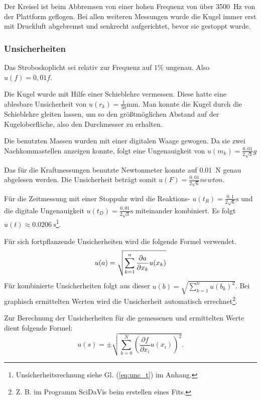 	Der Kreisel ist beim Abbremsen von einer hohen Frequenz von über \SI{3500}{\hertz} von der Plattform geflogen.
	Bei allen weiteren Messungen wurde die Kugel immer erst mit Druckluft abgebremst und senkrecht aufgerichtet, bevor sie gestoppt wurde.
	
	\subsubsection{Unsicherheiten}
	
	Das Stroboskoplicht sei relativ zur Frequenz auf $1\%$ ungenau.
	Also $u(f) = 0,01 f$.
	
	Die Kugel wurde mit Hilfe einer Schieblehre vermessen.
	Diese hatte eine ablesbare Unsicherheit von $u(r_k) =\frac{1}{50}\si{\milli\meter}$.
	Man konnte die Kugel durch die Schieblehre gleiten lassen, um so den größtmöglichen Abstand auf der Kugeloberfläche, also den Durchmesser zu erhalten.
	
	Die benutzten Massen wurden mit einer digitalen Waage gewogen.
	Da sie zwei Nachkommastellen anzeigen konnte, folgt eine Ungenauigkeit von $u(m_k) = \frac{0,01}{2\sqrt{3}}\si{g}$
	
	Das für die Kraftmessungen benutzte Newtonmeter konnte auf \SI{0,01}{\newton} genau abgelesen werden.
	Die Unsicherheit beträgt somit $u(F) = \frac{0,01}{2\sqrt{6}} \si{newton}$.
	
	Für die Zeitmessung mit einer Stoppuhr wird die Reaktions- $u(t_R) = \frac{0,1}{2\sqrt6}\si{\second}$ und die digitale Ungenauigkeit $u(t_D) = \frac{0,01}{2\sqrt3}\si{\second}$ miteinander kombiniert.
	Es folgt $u(t) \approx \SI{0,0206}{\second}$\footnote{Unsicherheitsrechnung siehe Gl. (\ref{eq:unc_t}) im Anhang.}.
	
	Für sich fortpflanzende Unsicherheiten wird die folgende Formel verwendet.
	\begin{equation}
		\label{eq:unc_combined}
		u(a) = \sqrt{\sum_{k=1}^{n} \pdv{a}{x_k} u(x_k)}
	\end{equation}
	Für kombinierte Unsicherheiten folgt aus dieser $u(b) = \sqrt{\sum_{k=1}^n u(b_k)^2}$.
	Bei graphisch ermittelten Werten wird die Unsicherheit automatisch errechnet\footnote{Z. B. im Programm SciDaVis beim erstellen eines Fits.}.

	Zur Berechnung der Unsicherheiten für die gemessenen und ermittelten Werte dient folgende Formel: 
	\begin{equation*}
		u(s) = \pm \sqrt{\sum_{k=0}^{N}\left( \frac{\partial f}{\partial x_i}u(x_i)\right) ^2}. 
	\end{equation*}


